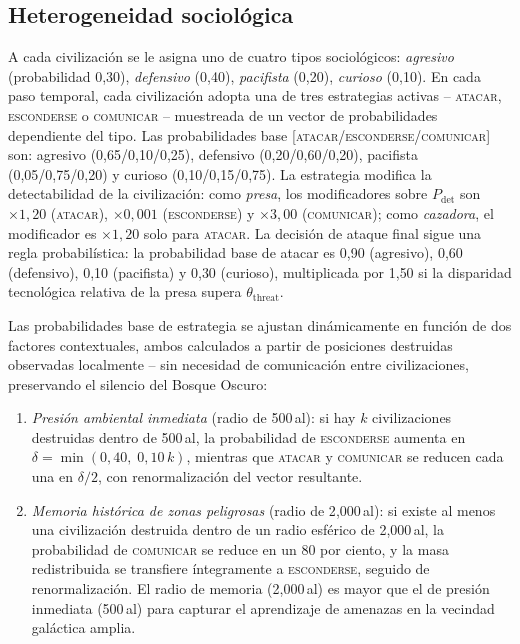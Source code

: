 \documentclass[11pt,a4paper,onecolumn]{article}
\begin{document}
\subsection{Heterogeneidad sociológica}
\label{sec:socio}

A cada civilización se le asigna uno de cuatro tipos sociológicos:
\emph{agresivo} (probabilidad 0{,}30), \emph{defensivo} (0{,}40),
\emph{pacifista} (0{,}20), \emph{curioso} (0{,}10).
En cada paso temporal, cada civilización adopta una de tres
estrategias activas -- \textsc{atacar}, \textsc{esconderse} o
\textsc{comunicar} -- muestreada de un vector de probabilidades
dependiente del tipo.
Las probabilidades base [\textsc{atacar}/\textsc{esconderse}/\textsc{comunicar}]
son: agresivo (0{,}65/0{,}10/0{,}25), defensivo (0{,}20/0{,}60/0{,}20),
pacifista (0{,}05/0{,}75/0{,}20) y curioso (0{,}10/0{,}15/0{,}75).
La estrategia modifica la detectabilidad de la civilización: como
\emph{presa}, los modificadores sobre $P_\text{det}$ son
$\times 1{,}20$ (\textsc{atacar}), $\times 0{,}001$
(\textsc{esconderse}) y $\times 3{,}00$ (\textsc{comunicar}); como
\emph{cazadora}, el modificador es $\times 1{,}20$ solo para
\textsc{atacar}.
La decisión de ataque final sigue una regla probabilística: la
probabilidad base de atacar es 0{,}90 (agresivo), 0{,}60 (defensivo),
0{,}10 (pacifista) y 0{,}30 (curioso), multiplicada por 1{,}50 si la
disparidad tecnológica relativa de la presa supera $\theta_\text{threat}$.

Las probabilidades base de estrategia se ajustan dinámicamente en
función de dos factores contextuales, ambos calculados a partir de
posiciones destruidas observadas localmente -- sin necesidad de
comunicación entre civilizaciones, preservando el silencio del Bosque
Oscuro:
\begin{enumerate}
  \item \emph{Presión ambiental inmediata} (radio de 500\,al):
        si hay $k$ civilizaciones destruidas dentro de 500\,al,
        la probabilidad de \textsc{esconderse} aumenta en
        $\delta = \min(0{,}40,\; 0{,}10\,k)$, mientras que
        \textsc{atacar} y \textsc{comunicar} se reducen cada una en
        $\delta/2$, con renormalización del vector resultante.
  \item \emph{Memoria histórica de zonas peligrosas} (radio de 2{,}000\,al):
        si existe al menos una civilización destruida dentro de un radio
        esférico de 2{,}000\,al, la probabilidad de \textsc{comunicar}
        se reduce en un 80 por ciento, y la masa redistribuida se
        transfiere íntegramente a \textsc{esconderse}, seguido de
        renormalización.
        El radio de memoria (2{,}000\,al) es mayor que el de presión
        inmediata (500\,al) para capturar el aprendizaje de amenazas
        en la vecindad galáctica amplia.
\end{enumerate}
\end{document}
